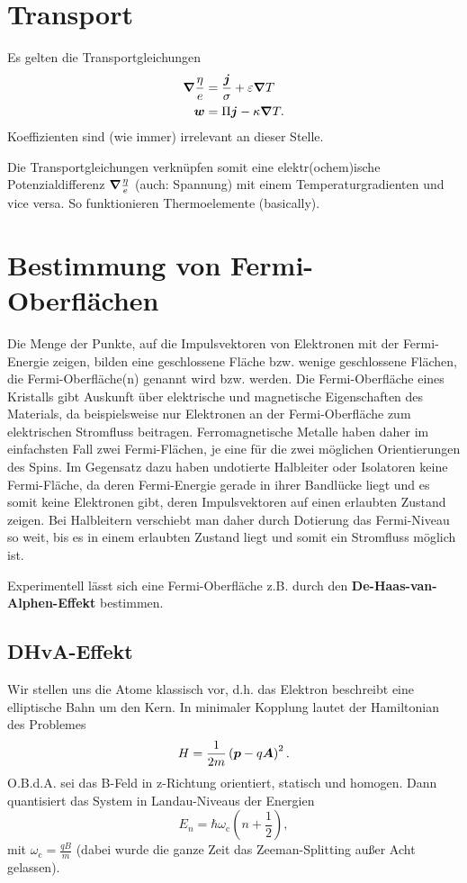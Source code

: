 \section{Transport}
Es gelten die Transportgleichungen
\begin{align*}
	\grad\frac{\eta}{e} &= \frac{\boldsymbol{j}}{\sigma} + \varepsilon\grad T \\
	\boldsymbol{w} &= \Pi\boldsymbol{j} - \kappa\grad T.
\end{align*}
Koeffizienten sind (wie immer) irrelevant an dieser Stelle.

Die Transportgleichungen verknüpfen somit eine elektr(ochem)ische Potenzialdifferenz $\grad\frac{\eta}{e}$ (auch: Spannung) mit einem Temperaturgradienten und vice versa.
So funktionieren Thermoelemente (basically).

\section{Bestimmung von Fermi-Oberflächen}
Die Menge der Punkte, auf die Impulsvektoren von Elektronen mit der Fermi-Energie zeigen, bilden eine geschlossene Fläche bzw. wenige geschlossene Flächen, die Fermi-Oberfläche(n) genannt wird bzw. werden.
Die Fermi-Oberfläche eines Kristalls gibt Auskunft über elektrische und magnetische Eigenschaften des Materials, da beispielsweise nur Elektronen an der Fermi-Oberfläche zum elektrischen Stromfluss beitragen.
Ferromagnetische Metalle haben daher im einfachsten Fall zwei Fermi-Flächen, je eine für die zwei möglichen Orientierungen des Spins.
Im Gegensatz dazu haben undotierte Halbleiter oder Isolatoren keine Fermi-Fläche, da deren Fermi-Energie gerade in ihrer Bandlücke liegt und es somit keine Elektronen gibt, deren Impulsvektoren auf einen erlaubten Zustand zeigen.
Bei Halbleitern verschiebt man daher durch Dotierung das Fermi-Niveau so weit, bis es in einem erlaubten Zustand liegt und somit ein Stromfluss möglich ist.

Experimentell lässt sich eine Fermi-Oberfläche z.B. durch den \textbf{De-Haas-van-Alphen-Effekt} bestimmen.

\subsection{DHvA-Effekt}
Wir stellen uns die Atome klassisch vor, d.h. das Elektron beschreibt eine elliptische Bahn um den Kern.
In minimaler Kopplung lautet der Hamiltonian des Problemes
\begin{equation*}
	H = \frac{1}{2m}\left(\boldsymbol{p}-q\boldsymbol{A}\right)^2.
\end{equation*}
O.B.d.A. sei das B-Feld in z-Richtung orientiert, statisch und homogen.
Dann quantisiert das System in Landau-Niveaus der Energien
\begin{equation*}
	E_n = \hbar\omega_\text{c}\left(n+\frac{1}{2}\right),
\end{equation*}
mit $\omega_\text{c}= \frac{qB}{m}$ (dabei wurde die ganze Zeit das Zeeman-Splitting außer Acht gelassen).

